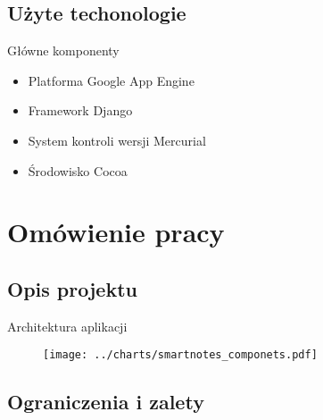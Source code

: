 \documentclass[slitetop]{beamer}
\begin{document}
\subsection{Użyte techonologie}

\begin{frame}{Główne komponenty}
\begin{itemize}
\item{Platforma Google App Engine}
\item{Framework  Django}
\item{System kontroli wersji Mercurial}
\item{Środowisko Cocoa}
\end{itemize}
\end{frame}

\section{Omówienie pracy}
\subsection{Opis projektu}

\begin{frame}{Architektura aplikacji}
\begin{figure}
	\begin{center}
		\texttt{[image: ../charts/smartnotes\_componets.pdf]}
  		\label{fig:smartnotes_components}
	\end{center}
\end{figure}
\end{frame}

\subsection{Ograniczenia i zalety}
\end{document}
